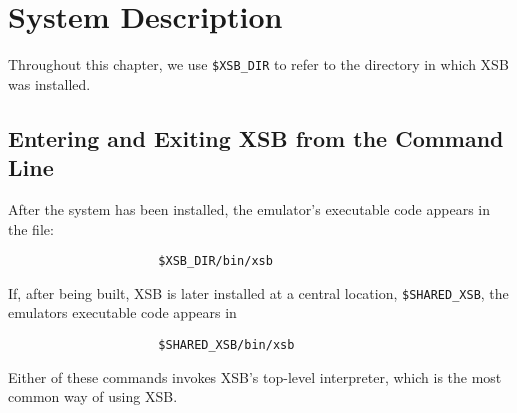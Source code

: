 \chapter{System Description} \label{chap:system}
\label{system}


Throughout this chapter, we use \verb'$XSB_DIR' to refer to the
directory in which XSB was installed.

\section{Entering and Exiting XSB from the Command Line}

After the system has been installed, the emulator's executable code appears 
in the file:
\begin{verbatim}
                     $XSB_DIR/bin/xsb
\end{verbatim}
If, after being built, XSB is later installed  at a central location,
\verb'$SHARED_XSB', the emulators executable code appears in
\begin{verbatim}
                     $SHARED_XSB/bin/xsb
\end{verbatim}
Either of these commands invokes XSB's top-level interpreter, which is
the most common way of using XSB.

